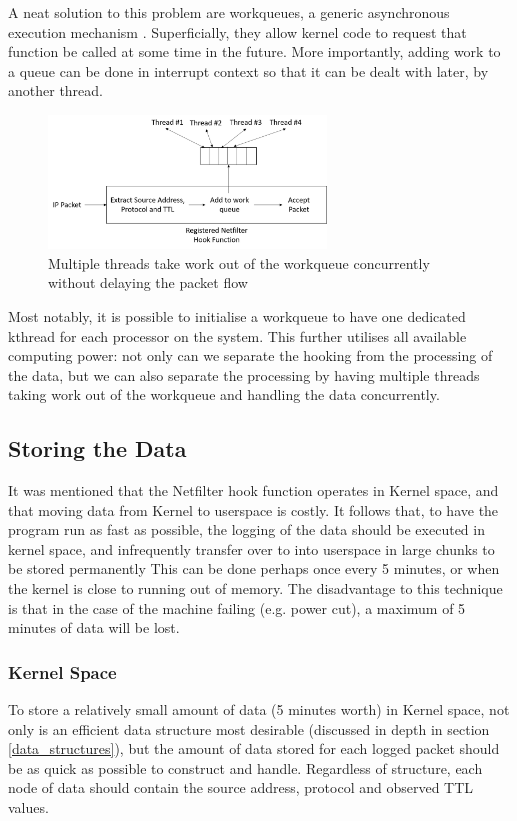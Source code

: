 \documentclass[twocolumn,10pt]{asme2ej}
\begin{document}
A neat solution to this problem are workqueues, a generic asynchronous execution mechanism \cite{workqueue}. Superficially, they allow kernel code to request that function be called at some time in the future. More importantly, adding work to a queue can be done in interrupt context so that it can be dealt with later, by another thread.

\begin{figure}[h]
	\begin{center}
		\includegraphics[width=7.37cm, height=3.55cm]{figures/workqueue}
	\end{center}
	\caption{Multiple threads take work out of the workqueue concurrently without delaying the packet flow}
	\label{figure_workqueue} 
\end{figure}

Most notably, it is possible to initialise a workqueue to have one dedicated kthread for each processor on the system. This further utilises all available computing power: not only can we separate the hooking from the processing of the data, but we can also separate the processing by having multiple threads taking work out of the workqueue and handling the data concurrently.

\subsection{Storing the Data}
It was mentioned that the Netfilter hook function operates in Kernel space, and that moving data from Kernel to userspace is costly. It follows that, to have the program run as fast as possible, the logging of the data should be executed in kernel space, and infrequently transfer over to into userspace in large chunks to be stored permanently This can be done perhaps once every 5 minutes, or when the kernel is close to running out of memory. The disadvantage to this technique is that in the case of the machine failing (e.g. power cut), a maximum of 5 minutes of data will be lost.

\subsubsection{Kernel Space}
To store a relatively small amount of data (5 minutes worth) in Kernel space, not only is an efficient data structure most desirable (discussed in depth in section \ref{data_structures}), but the amount of data stored for each logged packet should be as quick as possible to construct and handle. Regardless of structure, each node of data should contain the source address, protocol and observed TTL values. 
\end{document}
